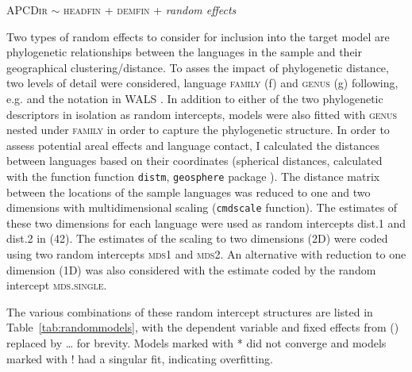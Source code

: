 \documentclass[A4paper]{article}
\begin{document}
\ex \textsc{APCDir} $\sim$ \textsc{headfin} + \textsc{demfin}  + \emph{random effects} \xe

Two types of random effects to consider for inclusion into the target model are phylogenetic relationships between the languages in the sample and their geographical clustering/distance. 
To asses the impact of phylogenetic distance, two levels of detail were considered, language \textsc{family} (f) and \textsc{genus} (g) following, e.g. \citet{dryer1989} and the notation in WALS \citep{wals}. In addition to either of the two phylogenetic descriptors in isolation as random intercepts, models were also fitted with \textsc{genus} nested under \textsc{family} in order to capture the phylogenetic structure.
In order to assess potential areal effects and language contact, I calculated the distances between languages based on their coordinates (spherical distances, calculated with the function function \texttt{distm}, \texttt{geosphere} package \citealt{R:geosphere}). The distance matrix between the locations of the sample languages was reduced to one and two dimensions with multidimensional scaling (\texttt{cmdscale} function). The estimates of these two dimensions for each language were used as random intercepts dist.1 and dist.2 in (42). 
The estimates of the scaling to two dimensions (2D) were coded using two random intercepts \textsc{mds1} and \textsc{mds2}. An alternative with reduction to one dimension (1D) was also considered with the estimate coded by the random intercept \textsc{mds.single}.
 
The various combinations of these random intercept structures are listed in Table~\ref{tab:randommodels}, with the dependent variable and fixed effects from (\lastx) replaced by \ldots{} for brevity.
Models marked with * did not converge and models marked with ! had a singular fit, indicating overfitting.
\end{document}
